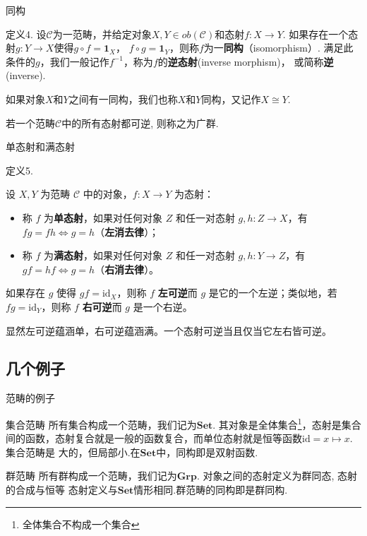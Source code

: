 \documentclass{beamer}
\newcommand\cat{\mathcal{C}}
\newcommand\id{\mathbf{1}}
\newcommand\Set{\mathbf{Set}}
\newcommand\Grp{\mathbf{Grp}}
\begin{document}
	\begin{frame}{同构}
		\begin{exampleblock}{定义4.}
			设$\cat$为一范畴，并给定对象$X, Y \in ob(\cat)$和态射$f : X \rightarrow Y$.
			如果存在一个态射$g : Y \rightarrow X$使得$g \circ f = \id_X$，
			$f \circ g = \id_Y$，则称$f$为一\textbf{同构}（isomorphism）.
			满足此条件的$g$，我们一般记作$f^{-1}$，称为$f$的\textbf{逆态射}(inverse morphism)，
			或简称\textbf{逆}(inverse).
			
			如果对象$X$和$Y$之间有一同构，我们也称$X$和$Y$同构，又记作$X \cong Y$.
			
			若一个范畴$\cat$中的所有态射都可逆, 则称之为广群.
		\end{exampleblock}
	\end{frame}
	
	\begin{frame}{单态射和满态射}
		\begin{exampleblock}{定义5.}
			
			设 $X, Y$ 为范畴 $\mathcal{C}$ 中的对象，$f: X \to Y$ 为态射：
			\begin{itemize}
				\item 称 $f$ 为\textbf{单态射}，如果对任何对象 $Z$ 和任一对态射 $g, h: Z \to X$，有 $fg = fh \iff g = h$（\textbf{左消去律}）；
				\item 称 $f$ 为\textbf{满态射}，如果对任何对象 $Z$ 和任一对态射 $g, h: Y \to Z$，有 $gf = hf \iff g = h$（\textbf{右消去律}）。
			\end{itemize}
			
			如果存在 $g$ 使得 $gf = \mathrm{id}_X$，则称 $f$ \textbf{左可逆}而 $g$ 是它的一个左逆；类似地，若 $fg = \mathrm{id}_Y$，则称 $f$ \textbf{右可逆}而 $g$ 是一个右逆。
			
			显然左可逆蕴涵单，右可逆蕴涵满。一个态射可逆当且仅当它左右皆可逆。
		\end{exampleblock}
	\end{frame}
	\subsection{几个例子}
	\begin{frame}{范畴的例子}
		
			\begin{exampleblock}{集合范畴}
				所有集合构成一个范畴，我们记为$\Set$. 其对象是全体集合\footnote{全体集合不构成一个集合}，态射是集合间的函数，态射复合就是一般的函数复合，而单位态射就是恒等函数$\mathrm{id} = x \mapsto x$. 集合范畴是
				大的，但局部小.在$\Set$中，同构即是双射函数.
			\end{exampleblock}
			
			\begin{exampleblock}{群范畴}
				所有群构成一个范畴，我们记为$\Grp$. 对象之间的态射定义为群同态, 态射的合成与恒等
				态射定义与$\Set$情形相同.群范畴的同构即是群同构.
			\end{exampleblock}
	\end{frame}
	
\end{document}
